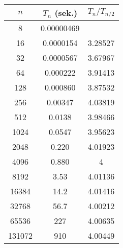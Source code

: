 \begin{figure}[t]
\begin{minipage}[t]{0.35\textwidth}
  \begin{tabular}{S[table-format=6.0]S[table-format= 3.8]S[table-format=1.2, round-mode=places,round-precision=2]}\toprule
    {$n$} & {$T_n$ (sek.)}  & {$T_n/T_{n/2}$} \\     &   0.00000469  &  \\ 
    16    &   0.0000154         & 3.28527 \\ 
    32      & 0.0000567         & 3.67967 \\ 
    64      & 0.000222          & 3.91413 \\ 
    128     & 0.000860          & 3.87532 \\ 
    256     & 0.00347           & 4.03819 \\ 
    512     & 0.0138            & 3.98466 \\ 
    1024    & 0.0547            & 3.95623 \\ 
    2048    & 0.220           & 4.01923 \\ 
    4096    & 0.880             & 4 \\ 
    8192    & 3.53              & 4.01136 \\ 
    16384   & 14.2              & 4.01416 \\ 
    32768   & 56.7              & 4.00212 \\ 
    65536   & 227               & 4.00635 \\ 
    131072  & 910               & 4.00449 \\ \bottomrule
\end{tabular}
\end{minipage}
%
\qquad
  \begin{minipage}{0.65\textwidth}
\end{minipage}
\end{figure}
